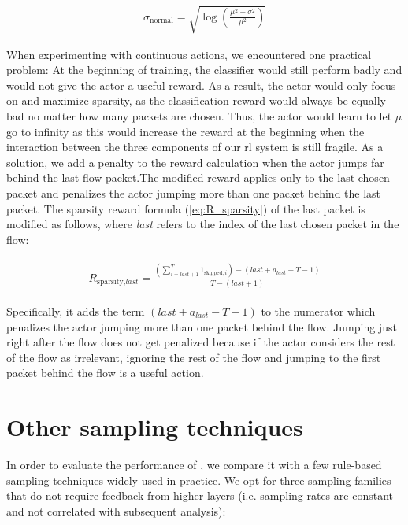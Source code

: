 \documentclass[conference]{IEEEtran}
\begin{document}
\begin{align}
\sigma_{\text{normal}} = \sqrt{\log\left(\frac{\mu^2 + \sigma^2}{\mu^2}\right)}
\end{align}

When experimenting with continuous actions, we encountered one practical problem: At the beginning of training, the classifier would still perform badly and would not give the actor a useful reward. As a result, the actor would only focus on and maximize sparsity, as the classification reward would always be equally bad no matter how many packets are chosen. Thus, the actor would learn to let $\mu$ go to infinity as this would increase the reward at the beginning when the interaction between the three components of our \gls{rl} system is still fragile. As a solution, we add a penalty to the reward calculation when the actor jumps far behind the last flow packet.The modified reward applies only to the last chosen packet and penalizes the actor jumping more than one packet behind the last packet. The sparsity reward formula (\autoref{eq:R_sparsity}) of the last packet is modified as follows, where \textit{last} refers to the index of the last chosen packet in the flow: 

\begin{align}
\begin{split}
R_{\text{sparsity},\textit{last}} = \frac{\left(\sum_{i=\textit{last}+1}^{T} 1_{\text{skipped},i}\right) - \left(\textit{last}+a_{\textit{last}} - T - 1\right)}{T- (\textit{last}+1)}
\end{split}
\label{eq:R_sparsity_last}
\end{align}

Specifically, it adds the term $\left(\textit{last}+a_{\textit{last}} - T - 1\right)$ to the numerator which penalizes the actor jumping more than one packet behind the flow. Jumping just right after the flow does not get penalized because if the actor considers the rest of the flow as irrelevant, ignoring the rest of the flow and jumping to the first packet behind the flow is a useful action. 

\section{Other sampling techniques}
\label{sec:other_sampling_techniques}
In order to evaluate the performance of \ours, we compare it with a few rule-based sampling techniques widely used in practice.
We opt for three sampling families that do not require feedback from higher layers (i.e. sampling rates are constant and not correlated with subsequent analysis): %
\end{document}
